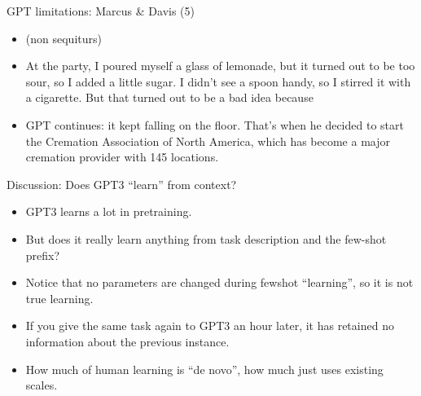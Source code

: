 
\begin{frame}{GPT limitations: Marcus \& Davis (5)}

\vfill

\begin{itemize}
  \item (non sequiturs)
  \item
At the party, I poured myself a glass of lemonade, but it
turned out to be too sour, so I added a little sugar. I
didn’t see a spoon handy, so I stirred it with a
cigarette. But that turned out to be a bad idea because

  \item
  GPT continues:
 it
kept falling on the floor. That’s when he decided to start
the Cremation Association of North America, which has become
a major cremation provider with 145 locations.


\end{itemize}

\vfill

\end{frame}


\begin{frame}{Discussion: Does GPT3 ``learn'' from context?}

\vfill

  \begin{itemize}
\item GPT3 learns a lot in pretraining.
    \item But does it really learn anything from
task description and    the few-shot prefix?
    \item Notice that no parameters are changed during
    fewshot ``learning'', so it is not true learning.
    \item If you give the same task again to GPT3 an
    hour later, it has retained no information about the
    previous instance.
    \item How much of human learning is ``de novo'',
    how much just uses existing scales.

    \end{itemize}

\vfill

\end{frame}


